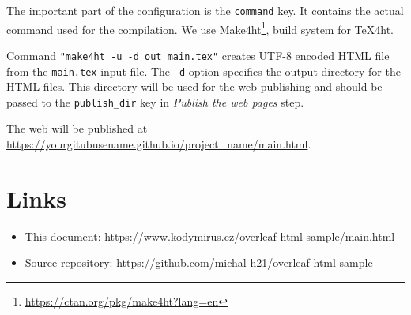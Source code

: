 \documentclass{article}
\newcommand{\cmdname}[1]{\texttt{#1}}
\newcommand\footurl[1]{\footnote{\url{#1}}}
\newcommand\urllink[2]{#1\footurl{#2}}
\begin{document}
The important part of the configuration is the \cmdname{command} key. It
contains the actual command used for the compilation. We use
\urllink{Make4ht}{https://ctan.org/pkg/make4ht?lang=en}, build system for
\TeX4ht.

Command \verb|"make4ht -u -d out main.tex"| creates UTF-8 encoded HTML file
from the \cmdname{main.tex} input file. The \texttt{-d} option specifies the
output directory for the HTML files. This directory will be used for the web
publishing and should be passed to the \verb|publish_dir| key in
\textit{Publish the web pages} step.

The web will be published at \url{https://yourgitubusename.github.io/project_name/main.html}. 
\section{Links}
\begin{itemize}
    \item This document: \url{https://www.kodymirus.cz/overleaf-html-sample/main.html}
    \item Source repository: \url{https://github.com/michal-h21/overleaf-html-sample} 
\end{itemize}
 
\end{document}
